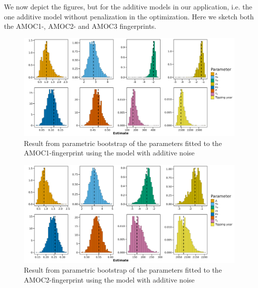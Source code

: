 We now depict the figures, but for the additive models in our application, i.e. the one additive model without penalization in the optimization. Here we sketch both the AMOC1-, AMOC2- and AMOC3 fingerprints.
\begin{figure}[h!]
    \begin{center}
        \includegraphics[scale = .09]{figures/estim_tibble_AMOC1_plot.jpeg}
        \caption{Result from parametric bootstrap of the parameters fitted to the AMOC1-fingerprint using the model with additive noise}
        \label{figure:AMOC1_additive_bootstrap}
    \end{center}
\end{figure}

\begin{figure}[h!]
    \begin{center}
        \includegraphics[scale = .09]{figures/estim_tibble_additive_plot.jpeg}
        \caption{Result from parametric bootstrap of the parameters fitted to the AMOC2-fingerprint using the model with additive noise}
        \label{figure:AMOC2_additive_bootstrap}
    \end{center}
\end{figure}

